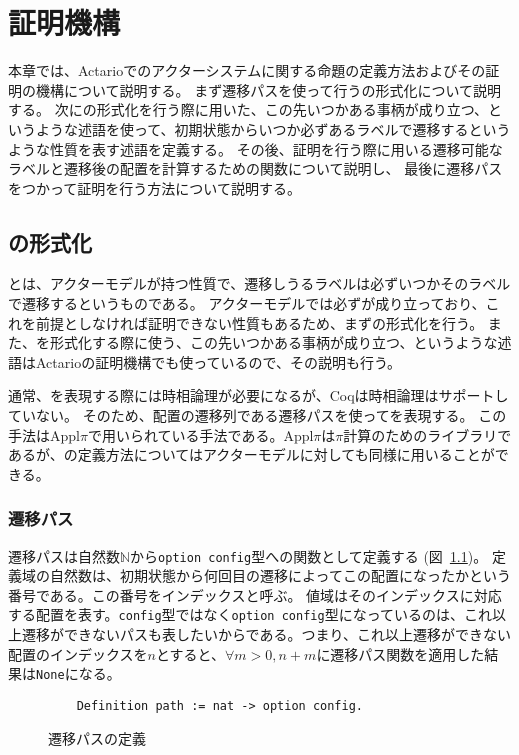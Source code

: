 \chapter{証明機構}

本章では、Actarioでのアクターシステムに関する命題の定義方法およびその証明の機構について説明する。
まず遷移パスを使って行う\fairness の形式化について説明する。
次に\fairness の形式化を行う際に用いた、この先いつかある事柄が成り立つ、というような述語を使って、初期状態からいつか必ずあるラベルで遷移するというような性質を表す述語を定義する。
その後、証明を行う際に用いる遷移可能なラベルと遷移後の配置を計算するための関数について説明し、
最後に遷移パスをつかって証明を行う方法について説明する。

\section{\fairness の形式化}
\fairness とは、アクターモデルが持つ性質で、遷移しうるラベルは必ずいつかそのラベルで遷移するというものである。
アクターモデルでは必ず\fairness が成り立っており、これを前提としなければ証明できない性質もあるため、まず\fairness の形式化を行う。
また、\fairness を形式化する際に使う、この先いつかある事柄が成り立つ、というような述語はActarioの証明機構でも使っているので、その説明も行う。

通常、\fairness を表現する際には時相論理が必要になるが、Coqは時相論理はサポートしていない。
そのため、配置の遷移列である遷移パスを使って\fairness を表現する。
この手法はAppl$\pi$\cite{}で用いられている手法である。Appl$\pi$は$\pi$計算のためのライブラリであるが、\fairness の定義方法についてはアクターモデルに対しても同様に用いることができる。

\subsection{遷移パス}
遷移パスは自然数$\mathbb{N}$から\texttt{option config}型への関数として定義する (図~\ref{code:formalization:path})。
定義域の自然数は、初期状態から何回目の遷移によってこの配置になったかという番号である。この番号をインデックスと呼ぶ。
値域はそのインデックスに対応する配置を表す。\texttt{config}型ではなく\texttt{option config}型になっているのは、これ以上遷移ができないパスも表したいからである。つまり、これ以上遷移ができない配置のインデックスを$n$とすると、$\forall m > 0, n + m$に遷移パス関数を適用した結果は\texttt{None}になる。

\begin{figure}[tp]
  \begin{lstlisting}
    Definition path := nat -> option config.
  \end{lstlisting}
  \label{code:formalization:path}
  \caption{遷移パスの定義}
\end{figure}

